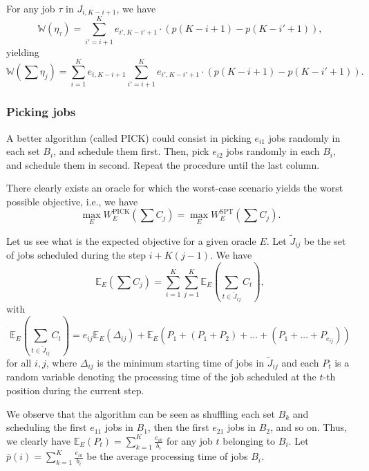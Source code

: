 \documentclass{article}
\begin{document}
For any job \(\tau\) in \(J_{i,K-i+1}\), we have
\[
    \mathbb{W}\left(\eta_{\tau}\right)=\sum_{i'=i+1}^K e_{i',K-i'+1}\cdot (p(K-i+1)-p(K-i'+1)),
\]
yielding
\[
    \mathbb{W}\left(\sum \eta_j\right)=\sum_{i=1}^K e_{i,K-i+1}\sum_{i'=i+1}^K e_{i',K-i'+1}\cdot (p(K-i+1)-p(K-i'+1)).
\]


\subsubsection{Picking jobs}

A better algorithm (called PICK) could consist in picking \(e_{i1}\) jobs randomly in each set \(B_i\), and schedule them first.
Then, pick \(e_{i2}\) jobs randomly in each \(B_i\), and schedule them in second. Repeat the procedure until the last column.

There clearly exists an oracle for which the worst-case scenario yields the worst possible objective, i.e., we have
\[
    \max_E W^{\text{PICK}}_E\left(\sum C_j\right)=\max_E W^{\text{SPT}}_E\left(\sum C_j\right).
\]


Let us see what is the expected objective for a given oracle \(E\).
Let \(\tilde{J}_{ij}\) be the set of jobs scheduled during the step \(i+K(j-1)\).
We have
\[
    \mathbb{E}_E\left(\sum C_j\right)=\sum_{i=1}^K \sum_{j=1}^K \mathbb{E}_E\left(\sum_{t\in \tilde{J}_{ij}} C_t\right),
\]
with
\[
    \mathbb{E}_E\left(\sum_{t\in \tilde{J}_{ij}} C_t\right)=
        e_{ij}\mathbb{E}_E\left(\Delta_{ij}\right)+\mathbb{E}_E\left(P_1+(P_1+P_2)+\dots+(P_1+\dots+P_{e_{ij}})\right)
\]
for all \(i,j\), where \(\Delta_{ij}\) is the minimum starting time of jobs in \(\tilde{J}_{ij}\) and each \(P_t\) is a random variable denoting the processing time of the job scheduled at the \(t\)-th position during the current step.

We observe that the algorithm can be seen as shuffling each set \(B_k\) and scheduling the first \(e_{11}\) jobs in \(B_1\), then the first \(e_{21}\) jobs in \(B_2\), and so on.
Thus, we clearly have \(\mathbb{E}_E\left(P_t\right)=\sum_{k=1}^K \frac{e_{ik}}{b_i}\) for any job \(t\) belonging to \(B_i\).
Let \(\bar{p}(i)=\sum_{k=1}^K \frac{e_{ik}}{b_i}\) be the average processing time of jobs \(B_i\).
\end{document}
